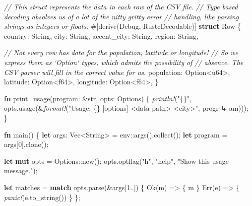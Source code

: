 \documentclass[a4paper,]{book}
\newenvironment{Shaded}{\begin{snugshade}}{\end{snugshade}}
\newcommand{\KeywordTok}[1]{\textcolor[rgb]{0.13,0.29,0.53}{\textbf{{#1}}}}
\newcommand{\DataTypeTok}[1]{\textcolor[rgb]{0.13,0.29,0.53}{{#1}}}
\newcommand{\DecValTok}[1]{\textcolor[rgb]{0.00,0.00,0.81}{{#1}}}
\newcommand{\ConstantTok}[1]{\textcolor[rgb]{0.00,0.00,0.00}{{#1}}}
\newcommand{\StringTok}[1]{\textcolor[rgb]{0.31,0.60,0.02}{{#1}}}
\newcommand{\CommentTok}[1]{\textcolor[rgb]{0.56,0.35,0.01}{\textit{{#1}}}}
\newcommand{\BuiltInTok}[1]{{#1}}
\newcommand{\PreprocessorTok}[1]{\textcolor[rgb]{0.56,0.35,0.01}{\textit{{#1}}}}
\newcommand{\AttributeTok}[1]{\textcolor[rgb]{0.77,0.63,0.00}{{#1}}}
\newcommand{\NormalTok}[1]{{#1}}
\begin{document}
\begin{Shaded}
\begin{Highlighting}[]
\CommentTok{// This struct represents the data in each row of the CSV file.}
\CommentTok{// Type based decoding absolves us of a lot of the nitty gritty error}
\CommentTok{// handling, like parsing strings as integers or floats.}
\AttributeTok{#[}\NormalTok{derive}\AttributeTok{(}\BuiltInTok{Debug}\AttributeTok{,} \NormalTok{RustcDecodable}\AttributeTok{)]}
\KeywordTok{struct} \NormalTok{Row \{}
    \NormalTok{country: }\DataTypeTok{String}\NormalTok{,}
    \NormalTok{city: }\DataTypeTok{String}\NormalTok{,}
    \NormalTok{accent_city: }\DataTypeTok{String}\NormalTok{,}
    \NormalTok{region: }\DataTypeTok{String}\NormalTok{,}

    \CommentTok{// Not every row has data for the population, latitude or longitude!}
    \CommentTok{// So we express them as `Option` types, which admits the possibility of}
    \CommentTok{// absence. The CSV parser will fill in the correct value for us.}
    \NormalTok{population: }\DataTypeTok{Option}\NormalTok{<}\DataTypeTok{u64}\NormalTok{>,}
    \NormalTok{latitude: }\DataTypeTok{Option}\NormalTok{<}\DataTypeTok{f64}\NormalTok{>,}
    \NormalTok{longitude: }\DataTypeTok{Option}\NormalTok{<}\DataTypeTok{f64}\NormalTok{>,}
\NormalTok{\}}

\KeywordTok{fn} \NormalTok{print_usage(program: &}\DataTypeTok{str}\NormalTok{, opts: Options) \{}
    \PreprocessorTok{println!}\NormalTok{(}\StringTok{"\{\}"}\NormalTok{, opts.usage(&}\PreprocessorTok{format!}\NormalTok{(}\StringTok{"Usage: \{\} [options] <data-path> <city>"}\NormalTok{, progr}
\NormalTok{↳ am)));}
\NormalTok{\}}

\KeywordTok{fn} \NormalTok{main() \{}
    \KeywordTok{let} \NormalTok{args: }\DataTypeTok{Vec}\NormalTok{<}\DataTypeTok{String}\NormalTok{> = env::args().collect();}
    \KeywordTok{let} \NormalTok{program = args[}\DecValTok{0}\NormalTok{].clone();}

    \KeywordTok{let} \KeywordTok{mut} \NormalTok{opts = Options::new();}
    \NormalTok{opts.optflag(}\StringTok{"h"}\NormalTok{, }\StringTok{"help"}\NormalTok{, }\StringTok{"Show this usage message."}\NormalTok{);}

    \KeywordTok{let} \NormalTok{matches = }\KeywordTok{match} \NormalTok{opts.parse(&args[}\DecValTok{1.}\NormalTok{.]) \{}
        \ConstantTok{Ok}\NormalTok{(m)  => \{ m \}}
        \ConstantTok{Err}\NormalTok{(e) => \{ }\PreprocessorTok{panic!}\NormalTok{(e.to_string()) \}}
    \NormalTok{\};}


\end{Highlighting}
\end{Shaded}
\end{document}
